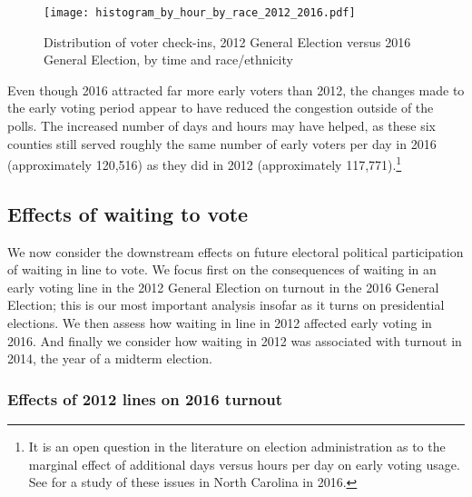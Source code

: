 \documentclass[12pt,titlepage]{article}
\begin{document}
\begin{figure}[!ht]
  \caption{Distribution of voter check-ins, 2012 General Election
    versus 2016 General Election, by time and race/ethnicity}
  \label{fig:race2012and2016}
  \centering
  \centering\texttt{[image: histogram\_by\_hour\_by\_race\_2012\_2016.pdf]}
\end{figure}

Even though 2016 attracted far more early voters than 2012, the
changes made to the early voting period appear to have reduced the
congestion outside of the polls. The increased number of days and
hours may have helped, as these six counties still served roughly the
same number of early voters per day in 2016 (approximately 120,516) as
they did in 2012 (approximately 117,771).\footnote{It is an open
  question in the literature on election administration as to the
  marginal effect of additional days versus hours per day on early
  voting usage.  See \citet{walkeretal:ncearly} for a study of these
  issues in North Carolina in 2016.}



\subsection*{Effects of waiting to vote}

We now consider the downstream effects on future electoral political
participation of waiting in line to vote. We focus first on the
consequences of waiting in an early voting line in the 2012 General
Election on turnout in the 2016 General Election; this is our most
important analysis insofar as it turns on presidential elections. We
then assess how waiting in line in 2012 affected early voting in 2016.
And finally we consider how waiting in 2012 was associated with
turnout in 2014, the year of a midterm election.

\subsubsection*{Effects of 2012 lines on 2016 turnout}
\end{document}
